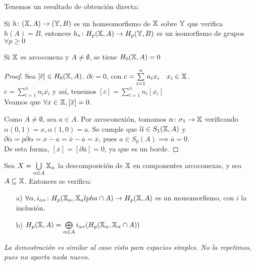 Tenemos un resultado de obtención directa:

\begin{corollary}
  Si $h \colon ({\mathbb X}, A) \to ({\mathbb Y}, B)$ es un homeomorfismo de ${\mathbb X}$ sobre ${\mathbb Y}$ que verifica $h(A) = B$, entonces
  $h_* \colon H_p({\mathbb X}, A) \to H_p({\mathbb Y}, B)$ es un isomorfismo de grupos $\forall p \geq 0$
\end{corollary}

\begin{proposition}
  Si ${\mathbb X}$ es arcoconexo y $A \neq \emptyset$, se tiene $H_0({\mathbb X}, A) = 0$
\end{proposition}

\begin{proof}
  Sea $[\overline{c}] \in H_0({\mathbb X}, A)$. $\partial\overline{c} = 0$, con $c = \sum\limits_{i = 1}^n n_i x_i \quad x_i \in {\mathbb X}$. \\
  $\overline{c} = \sum\limits_{i = 1}^n n_i \overline{x_i}$ y así, tenemos $[\overline{c}] = \sum\limits_{i = 1}^n n_i [\overline{x_i}]$ \\
  Veamos que $\forall x \in {\mathbb X}, [\overline{x}] = 0$.

  Como $A \neq \emptyset$, sea $a \in A$. Por arcoconexión, tomamos $\alpha \colon \sigma_1 \to {\mathbb X}$ verificando $\alpha(0, 1) = x, \alpha(1, 0) = a$.
  Se cumple que $\overline{\alpha} \in S_1({\mathbb X}, A)$ y $\partial\overline{\alpha} = \overline{p\partial\alpha} = \overline{x - a} = \overline{x} - \overline{a}
  = \overline{x}$, pues $a \in S_0(A) \implies \overline{a} = 0$. \\
  De esta forma, $[\overline{x}] = [\partial\overline{a}] = 0$, ya que es un borde.
\end{proof}

\begin{proposition}
  Sea $X = \bigcup\limits_{\alpha \in A} {\mathbb X}_\alpha$ la descomposición de ${\mathbb X}$ en componentes arcoconexas, y sea $A \subseteq {\mathbb X}$. Entonces se verifica:
  \begin{itemize}
    \item[a)] $\forall \alpha, i_{\alpha *} \colon H_p({\mathbb X}_\alpha, {\mathbb X}_alpha \cap A) \to H_p({\mathbb X}, A)$ es un monomorfismo, con $i$ la inclusión.
    \item[b)] $H_p({\mathbb X}, A) = \bigoplus\limits_{\alpha \in A}  i_{\alpha *}(H_p({\mathbb X}_\alpha, {\mathbb X}_\alpha \cap A))$
  \end{itemize}
\end{proposition}

\textit{La demostración es similar al caso visto para espacios simples. No la repetimos, pues no aporta nada nuevo.}


